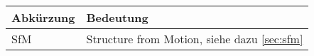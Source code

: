 


\begin{table}[h!]
    \begin{tabularx}{\textwidth}{l X}
        \toprule 
        Abkürzung & Bedeutung \\
        \midrule
        SfM & Structure from Motion, siehe dazu \autoref{sec:sfm} \nameref{sec:sfm}\\
        \bottomrule 
    \end{tabularx}
\end{table}

